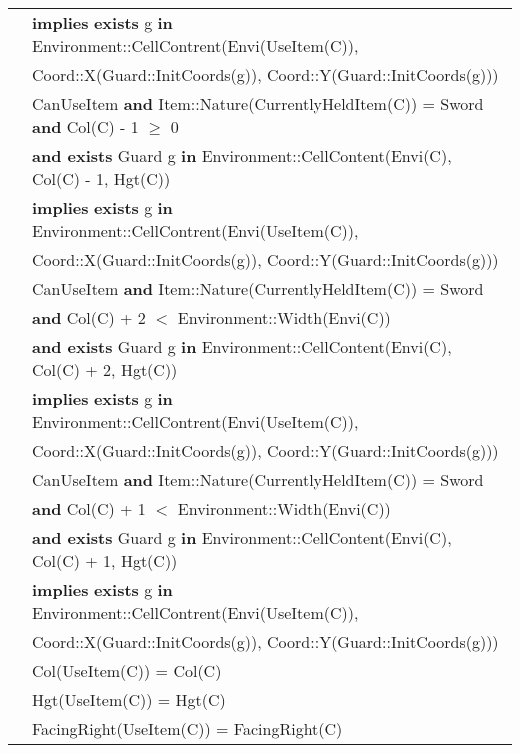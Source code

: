 \documentclass[7pt]{article}
\begin{document}
\begin{tabular}{rl}
& \quad \textbf{implies} \textbf{exists} g \textbf{in} Environment::CellContrent(Envi(UseItem(C)), \\
& \quad\quad\quad Coord::X(Guard::InitCoords(g)), Coord::Y(Guard::InitCoords(g))) \\
& CanUseItem \textbf{and} Item::Nature(CurrentlyHeldItem(C)) = Sword \textbf{and} Col(C) - 1 $\geq$  0 \\
& \quad \textbf{and exists} Guard g \textbf{in} Environment::CellContent(Envi(C), Col(C) - 1, Hgt(C)) \\
& \quad \textbf{implies} \textbf{exists} g \textbf{in} Environment::CellContrent(Envi(UseItem(C)), \\
& \quad\quad\quad Coord::X(Guard::InitCoords(g)), Coord::Y(Guard::InitCoords(g))) \\
& CanUseItem \textbf{and} Item::Nature(CurrentlyHeldItem(C)) = Sword \\
& \quad \textbf{and} Col(C) + 2 $<$ Environment::Width(Envi(C)) \\
& \quad \textbf{and exists} Guard g \textbf{in} Environment::CellContent(Envi(C), Col(C) + 2, Hgt(C)) \\
& \quad \textbf{implies} \textbf{exists} g \textbf{in} Environment::CellContrent(Envi(UseItem(C)), \\
& \quad\quad\quad Coord::X(Guard::InitCoords(g)), Coord::Y(Guard::InitCoords(g))) \\
& CanUseItem \textbf{and} Item::Nature(CurrentlyHeldItem(C)) = Sword \\
& \quad \textbf{and} Col(C) + 1 $<$ Environment::Width(Envi(C)) \\
& \quad \textbf{and exists} Guard g \textbf{in} Environment::CellContent(Envi(C), Col(C) + 1, Hgt(C)) \\
& \quad \textbf{implies} \textbf{exists} g \textbf{in} Environment::CellContrent(Envi(UseItem(C)), \\
& \quad\quad\quad Coord::X(Guard::InitCoords(g)), Coord::Y(Guard::InitCoords(g))) \\
& Col(UseItem(C)) = Col(C) \\
& Hgt(UseItem(C)) = Hgt(C) \\
& FacingRight(UseItem(C)) = FacingRight(C) \\

\end{tabular}
\newpage
\end{document}
